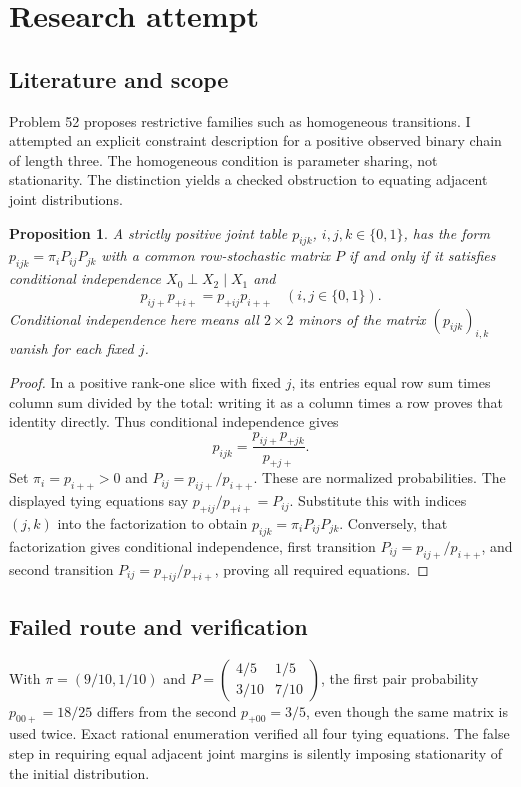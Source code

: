 \documentclass[11pt]{article}
\newtheorem{proposition}{Proposition}
\begin{document}
\section{Research attempt}
\subsection{Literature and scope}
Problem 52 proposes restrictive families such as homogeneous transitions. I attempted an explicit constraint description for a positive observed binary chain of length three. The homogeneous condition is parameter sharing, not stationarity. The distinction yields a checked obstruction to equating adjacent joint distributions.
\begin{proposition}
A strictly positive joint table $p_{ijk}$, $i,j,k\in\{0,1\}$, has the form $p_{ijk}=\pi_iP_{ij}P_{jk}$ with a common row-stochastic matrix $P$ if and only if it satisfies conditional independence $X_0\perp X_2\mid X_1$ and
\[
p_{ij+}p_{+i+}=p_{+ij}p_{i++}\quad(i,j\in\{0,1\}).
\]
Conditional independence here means all $2\times2$ minors of the matrix $(p_{ijk})_{i,k}$ vanish for each fixed $j$.
\end{proposition}
\begin{proof}
In a positive rank-one slice with fixed $j$, its entries equal row sum times column sum divided by the total: writing it as a column times a row proves that identity directly. Thus conditional independence gives
\[
p_{ijk}=\frac{p_{ij+}p_{+jk}}{p_{+j+}}.
\]
Set $\pi_i=p_{i++}>0$ and $P_{ij}=p_{ij+}/p_{i++}$. These are normalized probabilities. The displayed tying equations say $p_{+ij}/p_{+i+}=P_{ij}$. Substitute this with indices $(j,k)$ into the factorization to obtain $p_{ijk}=\pi_iP_{ij}P_{jk}$. Conversely, that factorization gives conditional independence, first transition $P_{ij}=p_{ij+}/p_{i++}$, and second transition $P_{ij}=p_{+ij}/p_{+i+}$, proving all required equations.
\end{proof}
\subsection{Failed route and verification}
With $\pi=(9/10,1/10)$ and $P=\left(\begin{smallmatrix}4/5&1/5\\3/10&7/10\end{smallmatrix}\right)$, the first pair probability $p_{00+}=18/25$ differs from the second $p_{+00}=3/5$, even though the same matrix is used twice. Exact rational enumeration verified all four tying equations. The false step in requiring equal adjacent joint margins is silently imposing stationarity of the initial distribution.
\end{document}
